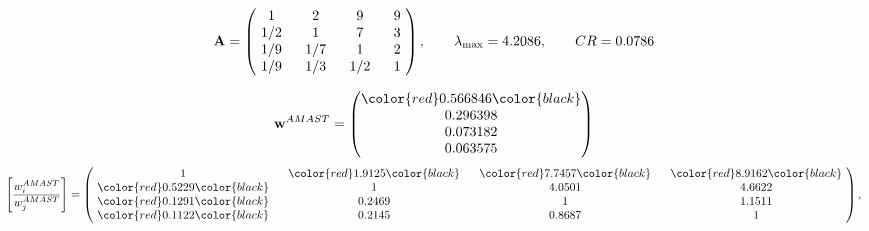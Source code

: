 \begin{example}
\begin{equation*}
\mathbf{A} =
\begin{pmatrix}
$\,\,$ 1 $\,\,$ & $\,\,$2$\,\,$ & $\,\,$9$\,\,$ & $\,\,$9 $\,\,$ \\
$\,\,$ 1/2$\,\,$ & $\,\,$ 1 $\,\,$ & $\,\,$7$\,\,$ & $\,\,$3 $\,\,$ \\
$\,\,$ 1/9$\,\,$ & $\,\,$ 1/7$\,\,$ & $\,\,$ 1 $\,\,$ & $\,\,$2 $\,\,$ \\
$\,\,$ 1/9$\,\,$ & $\,\,$ 1/3$\,\,$ & $\,\,$ 1/2$\,\,$ & $\,\,$ 1  $\,\,$ \\
\end{pmatrix},
\qquad
\lambda_{\max} =
4.2086,
\qquad
CR = 0.0786
\end{equation*}

\begin{equation*}
\mathbf{w}^{AMAST} =
\begin{pmatrix}
\color{red} 0.566846\color{black} \\
0.296398\\
0.073182\\
0.063575
\end{pmatrix}\end{equation*}
\begin{equation*}
\left[ \frac{{w}^{AMAST}_i}{{w}^{AMAST}_j} \right] =
\begin{pmatrix}
$\,\,$ 1 $\,\,$ & $\,\,$\color{red} 1.9125\color{black} $\,\,$ & $\,\,$\color{red} 7.7457\color{black} $\,\,$ & $\,\,$\color{red} 8.9162\color{black} $\,\,$ \\
$\,\,$\color{red} 0.5229\color{black} $\,\,$ & $\,\,$ 1 $\,\,$ & $\,\,$4.0501$\,\,$ & $\,\,$4.6622  $\,\,$ \\
$\,\,$\color{red} 0.1291\color{black} $\,\,$ & $\,\,$0.2469$\,\,$ & $\,\,$ 1 $\,\,$ & $\,\,$1.1511 $\,\,$ \\
$\,\,$\color{red} 0.1122\color{black} $\,\,$ & $\,\,$0.2145$\,\,$ & $\,\,$0.8687$\,\,$ & $\,\,$ 1  $\,\,$ \\
\end{pmatrix},
\end{equation*}


\end{example}
